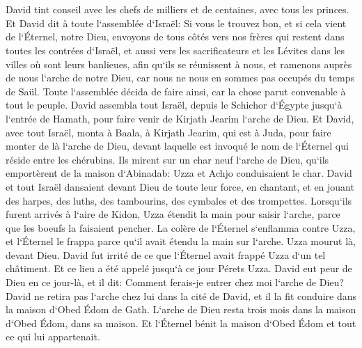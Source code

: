 \chapter{}

\verse David tint conseil avec les chefs de milliers et de centaines, avec tous les princes. 
\verse Et David dit à toute l`assemblée d`Israël: Si vous le trouvez bon, et si cela vient de l`Éternel, notre Dieu, envoyons de tous côtés vers nos frères qui restent dans toutes les contrées d`Israël, et aussi vers les sacrificateurs et les Lévites dans les villes où sont leurs banlieues, afin qu`ils se réunissent à nous, 
\verse et ramenons auprès de nous l`arche de notre Dieu, car nous ne nous en sommes pas occupés du temps de Saül. 
\verse Toute l`assemblée décida de faire ainsi, car la chose parut convenable à tout le peuple. 
\verse David assembla tout Israël, depuis le Schichor d`Égypte jusqu`à l`entrée de Hamath, pour faire venir de Kirjath Jearim l`arche de Dieu. 
\verse Et David, avec tout Israël, monta à Baala, à Kirjath Jearim, qui est à Juda, pour faire monter de là l`arche de Dieu, devant laquelle est invoqué le nom de l`Éternel qui réside entre les chérubins. 
\verse Ils mirent sur un char neuf l`arche de Dieu, qu`ils emportèrent de la maison d`Abinadab: Uzza et Achjo conduisaient le char. 
\verse David et tout Israël dansaient devant Dieu de toute leur force, en chantant, et en jouant des harpes, des luths, des tambourins, des cymbales et des trompettes. 
\verse Lorsqu`ils furent arrivés à l`aire de Kidon, Uzza étendit la main pour saisir l`arche, parce que les boeufs la faisaient pencher. 
\verse La colère de l`Éternel s`enflamma contre Uzza, et l`Éternel le frappa parce qu`il avait étendu la main sur l`arche. Uzza mourut là, devant Dieu. 
\verse David fut irrité de ce que l`Éternel avait frappé Uzza d`un tel châtiment. Et ce lieu a été appelé jusqu`à ce jour Pérets Uzza. 
\verse David eut peur de Dieu en ce jour-là, et il dit: Comment ferais-je entrer chez moi l`arche de Dieu? 
\verse David ne retira pas l`arche chez lui dans la cité de David, et il la fit conduire dans la maison d`Obed Édom de Gath. 
\verse L`arche de Dieu resta trois mois dans la maison d`Obed Édom, dans sa maison. Et l`Éternel bénit la maison d`Obed Édom et tout ce qui lui appartenait. 

\chapter{}

